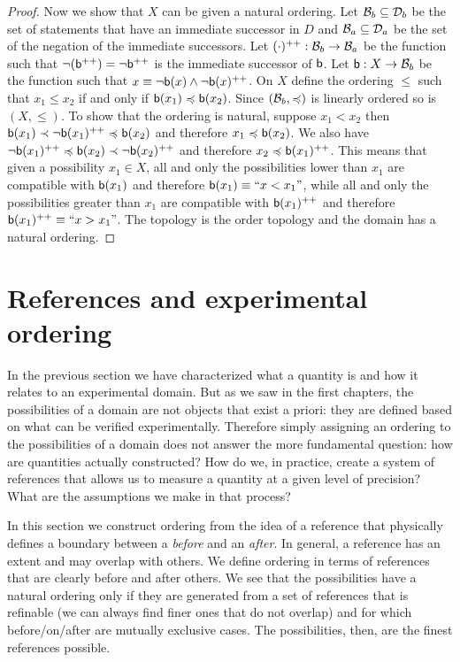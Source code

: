 \begin{mathSection}
\begin{proof}
		Now we show that $X$ can be given a natural ordering. Let $\basis_b \subseteq \edomain_b$ be the set of statements that have an immediate successor in $D$ and $\basis_a \subseteq \edomain_a$ be the set of the negation of the immediate successors. Let $(\cdot)^{++} : \basis_b \to \basis_a$ be the function such that $\NOT(\stmt[b]^{++}) = \NOT \stmt[b]^{++}$ is the immediate successor of $\stmt[b]$. Let $\stmt[b] : X \to \basis_b$ be the function such that $x \equiv \NOT \stmt[b](x) \AND \NOT \stmt[b](x) ^{++}$. On $X$ define the ordering $\leq$ such that $x_1 \leq x_2$ if and only if $\stmt[b](x_1) \narrower \stmt[b](x_2)$. Since $(\basis_b, \narrower)$ is linearly ordered so is $(X, \leq)$. To show that the ordering is natural, suppose $x_1 < x_2$ then $\stmt[b](x_1) \snarrower \NOT \stmt[b](x_1) ^{++} \narrower \stmt[b](x_2)$ and therefore $x_1 \narrower \stmt[b](x_2)$. We also have $\NOT \stmt[b](x_1) ^{++} \narrower \stmt[b](x_2) \snarrower \NOT \stmt[b](x_2) ^{++}$ and therefore $x_2 \narrower \stmt[b](x_1) ^{++}$. This means that given a possibility $x_1 \in X$, all and only the possibilities lower than $x_1$ are compatible with $\stmt[b](x_1)$ and therefore $\stmt[b](x_1) \equiv ``x < x_1"$, while all and only the possibilities greater than $x_1$ are compatible with $\stmt[b](x_1)^{++}$ and therefore $\stmt[b](x_1)^{++} \equiv ``x > x_1"$. The topology is the order topology and the domain has a natural ordering.
	\end{proof}
	
\end{mathSection}

\section{References and experimental ordering}

In the previous section we have characterized what a quantity is and how it relates to an experimental domain. But as we saw in the first chapters, the possibilities of a domain are not objects that exist a priori: they are defined based on what can be verified experimentally. Therefore simply assigning an ordering to the possibilities of a domain does not answer the more fundamental question: how are quantities actually constructed? How do we, in practice, create a system of references that allows us to measure a quantity at a given level of precision? What are the assumptions we make in that process?

In this section we construct ordering from the idea of a reference that physically defines a boundary between a \emph{before} and an \emph{after}. In general, a reference has an extent and may overlap with others. We define ordering in terms of references that are clearly before and after others. We see that the possibilities have a natural ordering only if they are generated from a set of references that is refinable (we can always find finer ones that do not overlap) and for which before/on/after are mutually exclusive cases. The possibilities, then, are the finest references possible.

